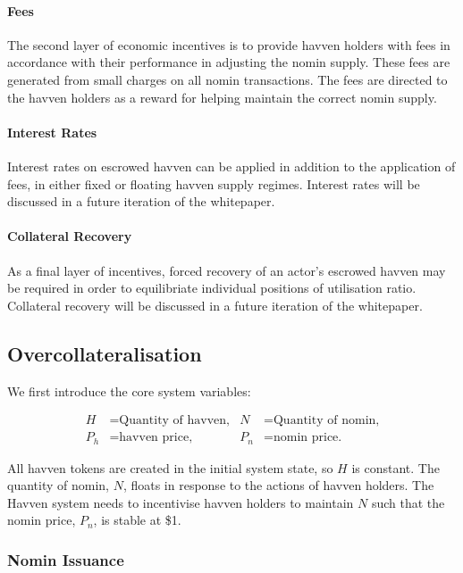 \paragraph{Fees}

\noindent The second layer of economic incentives is to provide havven holders with fees in accordance with their performance in adjusting the nomin supply. These fees are generated from small charges on all nomin transactions. The fees are directed to the havven holders as a reward for helping maintain the correct nomin supply.

\paragraph{Interest Rates}

\noindent Interest rates on escrowed havven can be applied in addition to the application of fees, in either fixed or floating havven supply regimes. Interest rates will be discussed in a future iteration of the whitepaper.

\paragraph{Collateral Recovery}

\noindent As a final layer of incentives, forced recovery of an actor's escrowed havven may be required in order to equilibriate individual positions of utilisation ratio. Collateral recovery will be discussed in a future iteration of the whitepaper.

\subsection{Overcollateralisation}

\noindent We first introduce the core system variables:

\begin{align*}
H &= \text{Quantity of havven,} & N &= \text{Quantity of nomin,} \\
P_h &= \text{havven price,}  & P_n &= \text{nomin price.}
\end{align*}

\noindent All havven tokens are created in the initial system state, so $H$ is constant. The quantity of nomin, $N$, floats in response to the actions of havven holders. The Havven system needs to incentivise havven holders to maintain $N$ such that the nomin price, $P_n$, is stable at \$1.

\subsubsection{Nomin Issuance}

